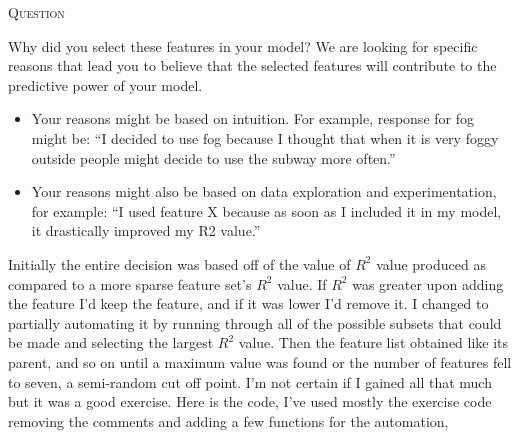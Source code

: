 \documentclass{article}
\newcounter{questionCtr}
\newenvironment{question}{%
   \bigskip\noindent%
   \refstepcounter{questionCtr}%
   \textsc{Question \thequestionCtr}%
   \newline%
   }{\par\bigskip}  %
\numberwithin{questionCtr}{section}
\numberwithin{problemCtr}{section}
\begin{document}
\begin{question}
  Why did you select these features in your model? We are looking for specific
  reasons that lead you to believe that the selected features will contribute to
  the predictive power of your model.
  \begin{itemize}
    \item Your reasons might be based on intuition. For example, response for
      fog might be: “I decided to use fog because I thought that when it is very
      foggy outside people might decide to use the subway more often.”
    \item Your reasons might also be based on data exploration and
      experimentation, for example: “I used feature X because as soon as I
      included it in my model, it drastically improved my R2 value.”
  \end{itemize}
\end{question}
Initially the entire decision was based off of the value of $R^2$ value produced
as compared to a more sparse feature set's $R^2$ value.  If $R^2$ was greater
upon adding the feature I'd keep the feature, and if it was lower I'd remove it.
I changed to partially automating it by running through all of the possible
subsets that could be made and selecting the largest $R^2$ value.  Then the
feature list obtained like its parent, and so on until a maximum value was found
or the number of features fell to seven, a semi-random cut off point.  I'm not
certain if I gained all that much but it was a good exercise.  Here is the code,
I've used mostly the exercise code removing the comments and adding a few
functions for the automation,
\end{document}
